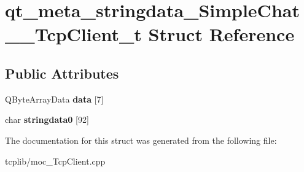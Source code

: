 \hypertarget{structqt__meta__stringdata__SimpleChat____TcpClient__t}{\section{qt\-\_\-meta\-\_\-stringdata\-\_\-\-Simple\-Chat\-\_\-\-\_\-\-Tcp\-Client\-\_\-t Struct Reference}
\label{structqt__meta__stringdata__SimpleChat____TcpClient__t}
}
\subsection*{Public Attributes}
\begin{DoxyCompactItemize}
\item 
\hypertarget{structqt__meta__stringdata__SimpleChat____TcpClient__t_a3216ad3b551f70814399eb8645acf8c6}{Q\-Byte\-Array\-Data {\bfseries data} \mbox{[}7\mbox{]}}\label{structqt__meta__stringdata__SimpleChat____TcpClient__t_a3216ad3b551f70814399eb8645acf8c6}

\item 
\hypertarget{structqt__meta__stringdata__SimpleChat____TcpClient__t_aa3273c574cfa60e883334bd4944ef412}{char {\bfseries stringdata0} \mbox{[}92\mbox{]}}\label{structqt__meta__stringdata__SimpleChat____TcpClient__t_aa3273c574cfa60e883334bd4944ef412}

\end{DoxyCompactItemize}


The documentation for this struct was generated from the following file\-:\begin{DoxyCompactItemize}
\item 
tcplib/moc\-\_\-\-Tcp\-Client.\-cpp\end{DoxyCompactItemize}
